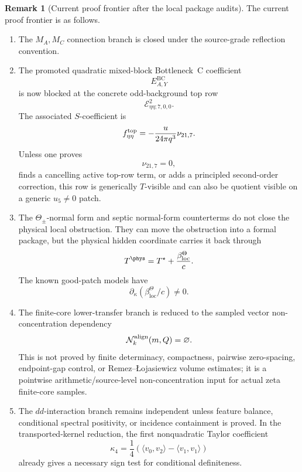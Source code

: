 \documentclass[11pt,a4paper]{amsart}
\theoremstyle{plain}
\theoremstyle{definition}
\newtheorem{remark}[theorem]{Remark}
\newcommand{\loc}{\mathrm{loc}}
\begin{document}
\begin{remark}[Current proof frontier after the local package audits]
\label{rem:current-proof-frontier-after-local-package-audits}
The current proof frontier is as follows.

\begin{enumerate}
\item The \(M_A,M_C\) connection branch is closed under the source-grade
reflection convention.

\item The promoted quadratic mixed-block Bottleneck~C coefficient
\[
E_{A,Y}^{\mathrm{BC}}
\]
is now blocked at the concrete odd-background top row
\[
\mathcal E^{2}_{\eta\eta;7,0,0}.
\]
The associated \(S\)-coefficient is
\[
f_{\eta\eta}^{\rm top}
=
-\frac{u}{24\pi q^3}\nu_{21,7}.
\]
Unless one proves
\[
\nu_{21,7}=0,
\]
finds a cancelling active top-row term, or adds a principled second-order
correction, this row is generically \(T\)-visible and can also be quotient
visible on a generic \(u_5\ne0\) patch.

\item The \(\Theta_\pm\)-normal form and septic normal-form counterterms do
not close the physical local obstruction.  They can move the obstruction into
a formal package, but the physical hidden coordinate carries it back through
\[
T^{\phys}
=
T^\star+\frac{\beta_{\loc}^{\Theta}}{c}.
\]
The known good-patch models have
\[
\partial_\kappa(\beta_{\loc}^{\Theta}/c)\ne0.
\]

\item The finite-core lower-transfer branch is reduced to the sampled vector
non-concentration dependency
\[
\mathcal N_k^{\rm align}(m,Q)=\varnothing.
\]
This is not proved by finite determinacy, compactness, pairwise zero-spacing,
endpoint-gap control, or Remez--{\L}ojasiewicz volume estimates; it is a
pointwise arithmetic/source-level non-concentration input for actual zeta
finite-core samples.

\item The \(dd\)-interaction branch remains independent unless feature
balance, conditional spectral positivity, or incidence containment is proved.
In the transported-kernel reduction, the first nonquadratic Taylor coefficient
\[
\kappa_4
=
\frac14
(\langle v_0,v_2\rangle-\langle v_1,v_1\rangle)
\]
already gives a necessary sign test for conditional definiteness.
\end{enumerate}
\end{remark}

\appendix
\end{document}

